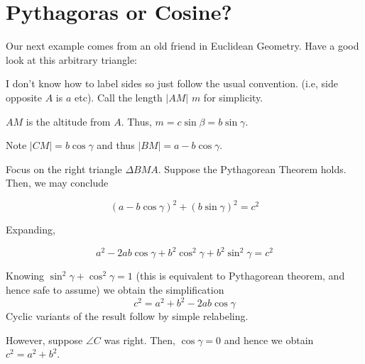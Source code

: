 \section*{Pythagoras or Cosine?}
Our next example comes from an old friend in Euclidean Geometry. Have a good look at this arbitrary triangle:
\begin{center}
\end{center}

I don't know how to label sides so just follow the usual convention. (i.e, side opposite $A$ is $a$ etc). Call the length $|AM|$ $m$ for simplicity.

$AM$ is the altitude from $A$. Thus, $m = c\sin\beta = b\sin\gamma$.

Note $|CM| = b\cos\gamma$ and thus $|BM| = a - b\cos\gamma$.

Focus on the right triangle $\Delta BMA$. Suppose the Pythagorean Theorem holds. Then, we may conclude

$$
(a - b\cos\gamma)^2 + (b\sin\gamma)^2 = c^2
$$

Expanding,

$$
a^2 -2ab\cos\gamma + b^2\cos^2\gamma +b^2\sin^2\gamma = c^2
$$

Knowing $\sin^2\gamma + \cos^2\gamma = 1$ (this is equivalent to Pythagorean theorem, and hence safe to assume) we obtain the simplification
$$
c^2 = a^2 + b^2 - 2ab\cos\gamma
$$
Cyclic variants of the result follow by simple relabeling.

However, suppose $\angle C$ was right. Then, $\cos\gamma = 0$ and hence we obtain $c^2 = a^2 + b^2$.

